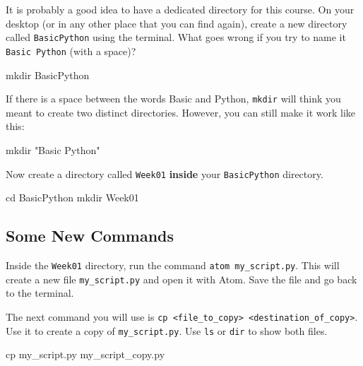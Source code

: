 \noindent It is probably a good idea to have a dedicated directory for this course. On your desktop (or in any other place that you can find again), create a new directory called \texttt{BasicPython} using the terminal. What goes wrong if you try to name it \texttt{Basic Python} (with a space)?

\vspace{1em}
\begin{solution}
    \begin{outputcode}
mkdir BasicPython
    \end{outputcode}

    \noindent If there is a space between the words Basic and Python, \texttt{mkdir} will think you meant to create two distinct directories. However, you can still make it work like this:

    \begin{outputcode}
mkdir "Basic Python"
    \end{outputcode}

\end{solution}

\noindent Now create a directory called \texttt{Week01} \textbf{inside} your \texttt{BasicPython} directory.

\vspace{1em}

\begin{solution}
    \begin{outputcode}
cd BasicPython
mkdir Week01
    \end{outputcode}
\end{solution}

\subsection{Some New Commands}

Inside the \texttt{Week01} directory, run the command \texttt{atom my\_script.py}. This will create a new file \texttt{my\_script.py} and open it with Atom. Save the file and go back to the terminal.

\vspace{1em}

\noindent The next command you will use is \texttt{cp <file\_to\_copy> <destination\_of\_copy>}. Use it to create a copy of \texttt{my\_script.py}. Use \texttt{ls} or \texttt{dir} to show both files.

\vspace{1em}

\begin{solution}
    \begin{outputcode}
cp my_script.py my_script_copy.py
    \end{outputcode}
\end{solution}

